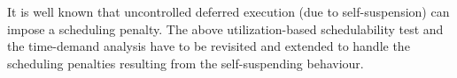 It is well known that uncontrolled deferred execution (due to
self-suspension) can impose a scheduling penalty. The above
utilization-based schedulability test and the time-demand analysis
have to be revisited and extended to handle the scheduling penalties
resulting from the self-suspending behaviour.




  
  
  